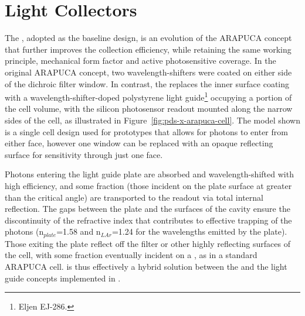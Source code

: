 

\section{Light Collectors}
\label{sec:fdsp-pd-lc}

The , adopted as the baseline design, is an evolution of the ARAPUCA concept that further improves the collection efficiency, while retaining the same working principle, mechanical form factor and active photosensitive coverage. 
 In the original ARAPUCA concept, two wavelength-shifters were coated on either side of the dichroic filter window. 
 In contrast, the  replaces the inner surface coating with a wavelength-shifter-doped %
 polystyrene light guide\footnote{Eljen EJ-286\texttrademark{}.} occupying a portion of the cell volume, with the silicon photosensor readout mounted along the narrow sides of the cell, as illustrated in Figure~\ref{fig:pds-x-arapuca-cell}. The model shown is a single cell design used for prototypes that allows for photons to enter from either face, however one window can be replaced with an opaque reflecting surface for sensitivity through just one face.

Photons entering the light guide plate are absorbed and wavelength-shifted with high efficiency, and some fraction (those incident on the plate surface at greater than the critical angle) are transported to the readout via total internal reflection. The  gaps between the plate and the surfaces of the cavity ensure the discontinuity of the refractive index that contributes to effective trapping of the photons (n$_{plate}$=1.58 and n$_{LAr}$=1.24 for the wavelengths emitted by the plate).
Those exiting the plate reflect off the filter or other highly reflecting surfaces of the cell, with some fraction eventually incident on a , as in a standard ARAPUCA cell.
 is thus effectively a hybrid solution between the  and the  light guide concepts implemented in .


